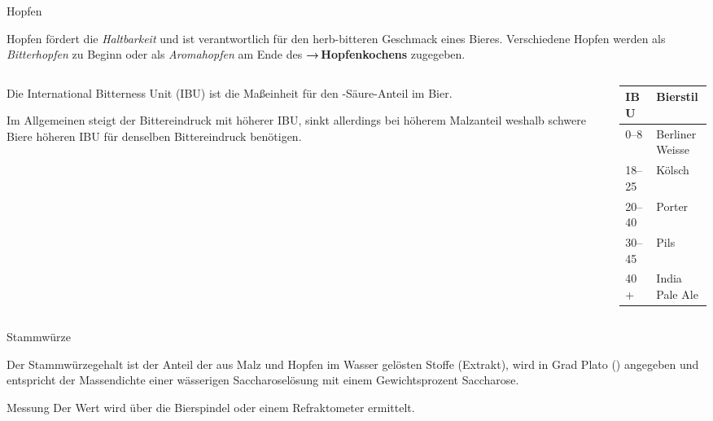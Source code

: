 \documentclass[9pt, ngerman]{beamer}
\newcommand{\forward}[1]{\textbf{→\,#1}}
\begin{document}
\begin{frame}{Hopfen}

  Hopfen fördert die \emph{Haltbarkeit} und ist verantwortlich für den
  herb-bitteren Geschmack eines Bieres. Verschiedene Hopfen werden als
  \emph{Bitterhopfen} zu Beginn oder als \emph{Aromahopfen} am Ende des
  \forward{Hopfenkochens} zugegeben.

  \begin{columns}[onlytextwidth]
    \begin{column}{0.6\textwidth}

      Die International Bitterness Unit (IBU) ist die Maßeinheit für den
      \textalpha-Säure-Anteil im Bier.

      Im Allgemeinen steigt der Bittereindruck mit höherer IBU, sinkt allerdings
      bei höherem Malzanteil weshalb schwere Biere höheren IBU für denselben
      Bittereindruck benötigen.

    \end{column}

    \begin{column}{0.4\textwidth}
      \begin{table}
        \begin{tabular}{ll}
          \textbf{IBU} & \textbf{Bierstil}\\
          \midrule
          \numrange{0}{8}   & Berliner Weisse\\
          \numrange{18}{25} & Kölsch\\
          \numrange{20}{40} & Porter\\
          \numrange{30}{45} & Pils\\
          40+               & India Pale Ale\\
        \end{tabular}
      \end{table}
    \end{column}
  \end{columns}

\end{frame}
\begin{frame}{Stammwürze}

  Der Stammwürzegehalt ist der Anteil der aus Malz und Hopfen im Wasser gelösten
  Stoffe (Extrakt), wird in Grad Plato (\si{\dP})  angegeben und entspricht der
  Massendichte einer wässerigen Saccharoselösung mit einem Gewichtsprozent
  Saccharose.

  \begin{block}{Messung}
    Der Wert wird über die Bierspindel oder einem Refraktometer ermittelt.
  \end{block}
\end{frame}
\end{document}
